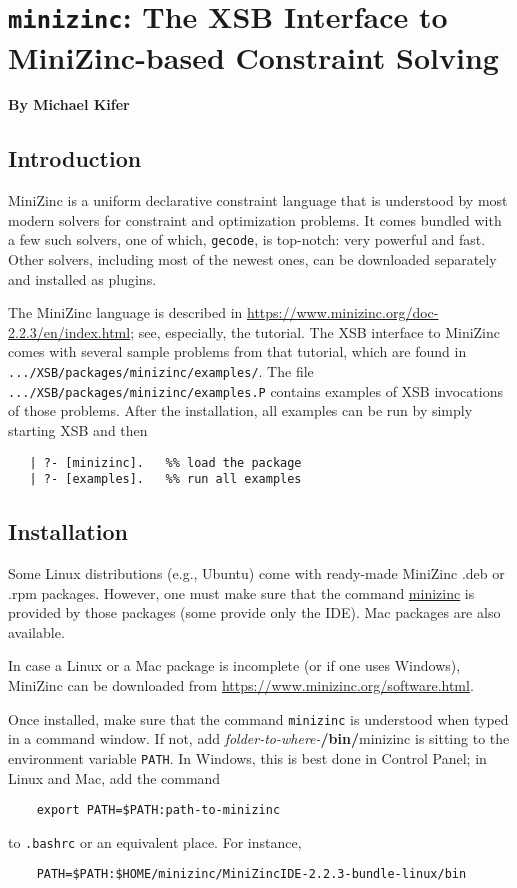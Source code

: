 
\chapter[Interface to MiniZinc]{{\tt minizinc}: The XSB Interface to MiniZinc-based Constraint
  Solving}

\begin{center}
  {\Large {\bf By Michael Kifer}}
\end{center}



\section{Introduction}

MiniZinc is a uniform declarative constraint language that is understood by
most modern solvers for constraint and optimization problems. It comes bundled with a few such solvers, one of
which, \texttt{gecode}, is top-notch: very powerful and fast.  Other solvers,
including most of the newest ones, can be downloaded separately and
installed as plugins.

The MiniZinc language is described in
\url{https://www.minizinc.org/doc-2.2.3/en/index.html}; see, especially, the
tutorial. 
The XSB interface to MiniZinc comes with several sample problems from that
tutorial, which are found in \texttt{.../XSB/packages/minizinc/examples/}.
The file \texttt{.../XSB/packages/minizinc/examples.P} contains examples of
XSB invocations of those problems. After the installation, all examples can be run
by simply starting XSB and then
\begin{verbatim}
   | ?- [minizinc].   %% load the package
   | ?- [examples].   %% run all examples
\end{verbatim}

\section{Installation}

Some Linux distributions (e.g., Ubuntu) come with ready-made MiniZinc .deb
or .rpm packages. However, one must make sure that the command
\url{minizinc} is provided by those packages (some provide only the IDE).
Mac packages are also available.

In case a Linux or a Mac package is incomplete (or if one uses Windows),
MiniZinc can be downloaded from
\url{https://www.minizinc.org/software.html}. 

Once installed, make sure that the command \texttt{minizinc} is understood when typed in a
command window. If not, add \emph{folder-to-where-}\textbf{/bin/}minizinc is sitting to the
environment variable \texttt{PATH}.  In Windows, this is best done in
Control Panel; in Linux and Mac, add the command
\begin{verbatim}
    export PATH=$PATH:path-to-minizinc
\end{verbatim}
to \texttt{.bashrc} or an equivalent place. For instance,
\begin{verbatim}
    PATH=$PATH:$HOME/minizinc/MiniZincIDE-2.2.3-bundle-linux/bin
\end{verbatim}

